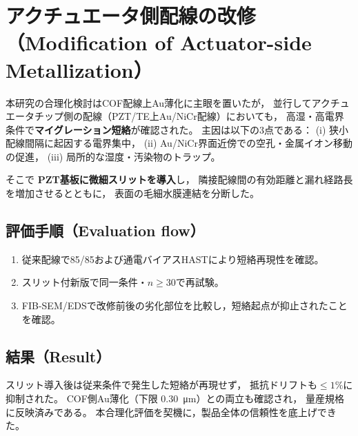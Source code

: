 \documentclass[conference]{IEEEtran}
\begin{document}
\appendices
\section{アクチュエータ側配線の改修（Modification of Actuator-side Metallization）}

本研究の合理化検討はCOF配線上Au薄化に主眼を置いたが，
並行してアクチュエータチップ側の配線（PZT/TE上Au/NiCr配線）においても，
高湿・高電界条件で\textbf{マイグレーション短絡}が確認された。
主因は以下の3点である：
(i) 狭小配線間隔に起因する電界集中，
(ii) Au/NiCr界面近傍での空孔・金属イオン移動の促進，
(iii) 局所的な湿度・汚染物のトラップ。

そこで \textbf{PZT基板に微細スリットを導入}し，
隣接配線間の有効距離と漏れ経路長を増加させるとともに，
表面の毛細水膜連結を分断した。

\subsection*{評価手順（Evaluation flow）}
\begin{enumerate}
  \item 従来配線で85/85および通電バイアスHASTにより短絡再現性を確認。
  \item スリット付新版で同一条件・$n\ge30$で再試験。
  \item FIB-SEM/EDSで改修前後の劣化部位を比較し，短絡起点が抑止されたことを確認。
\end{enumerate}

\subsection*{結果（Result）}
スリット導入後は従来条件で発生した短絡が再現せず，
抵抗ドリフトも$\le1\%$に抑制された。
COF側Au薄化（下限 \SI{0.30}{\micro\meter}）との両立も確認され，
量産規格に反映済みである。
本合理化評価を契機に，製品全体の信頼性を底上げできた。
\end{document}
